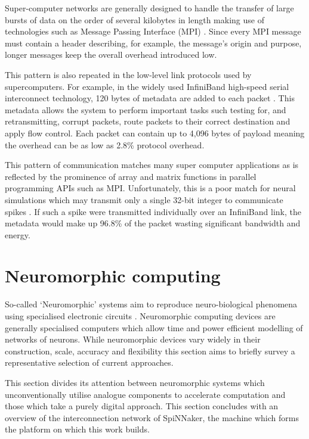 				Super-computer networks are generally designed to handle the transfer of
				large bursts of data on the order of several kilobytes in length making
				use of technologies such as Message Passing Interface (MPI)
				\cite{mpiforum12}. Since every MPI message must contain a header
				describing, for example, the message's origin and purpose, longer
				messages keep the overall overhead introduced low.
				
				This pattern is also repeated in the low-level link protocols used by
				supercomputers.  For example, in the widely used InfiniBand
				high-speed serial interconnect technology, 120 bytes of metadata are
				added to each packet \cite{infinibandta08}. This metadata allows the
				system to perform important tasks such testing for, and retransmitting,
				corrupt packets, route packets to their correct destination and apply
				flow control. Each packet can contain up to 4,096 bytes of payload
				meaning the overhead can be as low as 2.8\% protocol overhead.
				
				This pattern of communication matches many super computer applications
				as is reflected by the prominence of array and matrix functions in
				parallel programming APIs such as MPI. Unfortunately, this is a poor
				match for neural simulations which may transmit only a single 32-bit
				integer to communicate spikes \cite{davies12}. If such a spike were
				transmitted individually over an InfiniBand link, the metadata would
				make up 96.8\% of the packet wasting significant bandwidth and energy.
				
	
	
	\section{Neuromorphic computing}
		
		So-called `Neuromorphic' systems aim to reproduce neuro-biological phenomena
		using specialised electronic circuits \cite{mead90}. Neuromorphic computing
		devices are generally specialised computers which allow time and power
		efficient modelling of networks of neurons. While neuromorphic devices vary
		widely in their construction, scale, accuracy and flexibility this section
		aims to briefly survey a representative selection of current approaches.
		
		This section divides its attention between neuromorphic systems which
		unconventionally utilise analogue components to accelerate computation and
		those which take a purely digital approach. This section concludes with an
		overview of the interconnection network of SpiNNaker, the machine which
		forms the platform on which this work builds.
		
